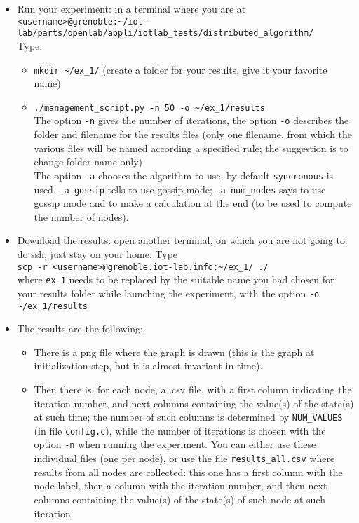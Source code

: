 \documentclass{article}
\begin{document}
\begin{itemize}
\item Run your experiment: in a  terminal where you are at \\
\verb=<username>@grenoble:~/iot-lab/parts/openlab/appli/iotlab_tests/distributed_algorithm/= \\
Type:
	\begin{itemize}
	\item \verb=mkdir ~/ex_1/= (create a folder for your results, give it your favorite name)
	\item \verb=./management_script.py -n 50 -o ~/ex_1/results= \\
	The option \verb=-n= gives the number of iterations, the option \verb=-o= describes the folder and filename for the results files (only one filename, from which the various files will be named according a specified rule; the suggestion is to change folder name only)\\
	The option \verb=-a= chooses the algorithm to use, by default \verb=syncronous= is used. \verb=-a gossip= tells to use gossip mode; \verb=-a num_nodes= says to use gossip mode and to make a calculation at the end (to be used to compute the number of nodes).
	\end{itemize}
\item Download the results: open another terminal, on which you are not going to do ssh, just stay on your home. Type \\
         \verb=scp -r <username>@grenoble.iot-lab.info:~/ex_1/ ./=\\
where \verb=ex_1=  needs to be replaced  by the suitable name you had chosen for your results folder while launching the experiment, with the option \verb=-o ~/ex_1/results=
\item The results are the following:
    \begin{itemize}
        \item There is a png file where the graph is drawn (this is the graph at initialization step, but it is almost invariant in time).
        \item Then there is, for each node, a .csv file, with a first column indicating the iteration number, and next columns containing the value(s) of the state(s) at such time; the number of such columns is determined by \verb=NUM_VALUES= (in file \verb=config.c=), while the number of iterations is chosen with the option \verb=-n= when running the experiment.
                You can either use these individual files (one per node), or use the file \verb=results_all.csv= where results from all nodes are collected: this one has a first column with the node label, then a column with the iteration number, and then next columns containing the value(s) of the state(s) of such node at such iteration.

\end{itemize}
\end{itemize}
\end{document}
